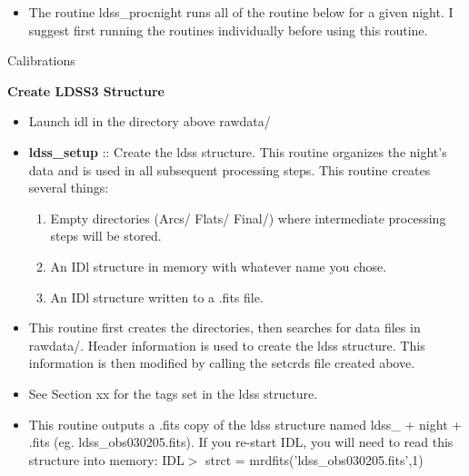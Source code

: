 \documentclass[11pt,letterpaper,dvips]{article}
\begin{document}
\begin{enumerate}
\begin{itemize}
\begin{itemize}
	\item If strct[*].flg\_anly = 0 an exposure is not analyzed (eg. a bad flat field or alignment
	  exposures.)

        \end{itemize}
	

	 \item The routine ldss\_procnight runs all of the routine
	   below for a given night.  I suggest first running the
	   routines individually before using this routine.

     \end{itemize}




{\Large \bf \item Calibrations }

{\Large \bf Create LDSS3 Structure }
  
   \begin{itemize}
    \item Launch idl in the directory above rawdata/


    \item {\bf ldss\_setup} :: Create the ldss structure.  This routine
      organizes the night's data and is used in all subsequent processing steps.
      This routine creates several things:
         \begin{enumerate}
	   \item  Empty directories (Arcs/ Flats/ Final/) where intermediate
	     processing steps will be stored.
	   \item  An IDl structure in memory with whatever name you chose.
	   \item  An IDl structure written to a .fits file.
         \end{enumerate}
    \item This routine first creates the directories, then searches for data
      files in rawdata/.  Header information is used to create the ldss
      structure.  This information is then modified by calling the 
      setcrds file created above.
      
    \item See Section xx for the tags set in the ldss structure.

    \item This routine outputs a .fits copy of the ldss structure
      named ldss\_ + night + .fits (eg. ldss_obs030205.fits).  If you
      re-start IDL, you will need to read this structure into memory:
      IDL$>$ strct = mrdfits('ldss_obs030205.fits',1)


\end{itemize}
\end{enumerate}
\end{document}
